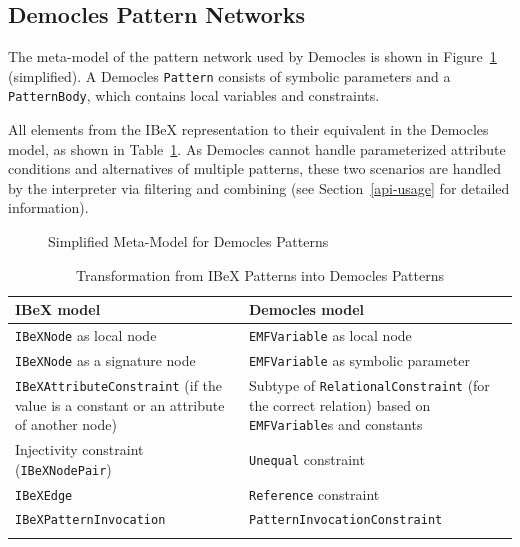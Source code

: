 \subsection{Democles Pattern Networks}
\label{democles-pattern-networks}
The meta-model of the pattern network used by Democles is shown in Figure~\ref{fig:democles-patterns-meta-model} (simplified).
A Democles \texttt{Pattern} consists of symbolic parameters and a \texttt{PatternBody}, which contains local variables and constraints.

All elements from the IBeX representation to their equivalent in the Democles model, as shown in Table~\ref{table:pattern-networks}.
As Democles cannot handle parameterized attribute conditions and alternatives of multiple patterns, these two scenarios are handled by the interpreter via filtering and combining (see Section~\ref{api-usage} for detailed information).

\begin{figure}[H]
	\centering
	
	\caption{Simplified Meta-Model for Democles Patterns}
	\label{fig:democles-patterns-meta-model}
\end{figure}

\begin{longtable}[h!]{p{75mm}p{65mm}}
	\toprule
	IBeX model
		& Democles model \\
	\midrule
	\texttt{IBeXNode} as local node
		& \texttt{EMFVariable} as local node \\
	\texttt{IBeXNode} as a signature node
		& \texttt{EMFVariable} as symbolic parameter \\
	\texttt{IBeXAttributeConstraint} (if the value is a constant or an attribute of another node)
		& Subtype of \texttt{RelationalConstraint} (for the correct relation) based on \texttt{EMFVariable}s and constants \\
	Injectivity constraint (\texttt{IBeXNodePair})
		& \texttt{Unequal} constraint \\
	\texttt{IBeXEdge}
		& \texttt{Reference} constraint \\
	\texttt{IBeXPatternInvocation}
		& \texttt{PatternInvocationConstraint} \\
	\bottomrule
	\caption{Transformation from IBeX Patterns into Democles Patterns}
	\label{table:pattern-networks}
\end{longtable}
